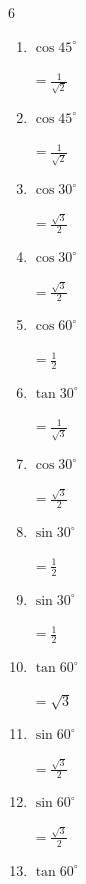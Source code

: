 \begin{multicols}{6}
\begin{enumerate}
        $\displaystyle =\frac{1}{\sqrt{3}}$

  \item $\displaystyle \cos{45^\circ}$

        $\displaystyle =\frac{1}{\sqrt{2}}$

  \item $\displaystyle \cos{45^\circ}$

        $\displaystyle =\frac{1}{\sqrt{2}}$

  \item $\displaystyle \cos{30^\circ}$

        $\displaystyle =\frac{\sqrt{3}}{2}$

\columnbreak %

  \item $\displaystyle \cos{30^\circ}$

        $\displaystyle =\frac{\sqrt{3}}{2}$

  \item $\displaystyle \cos{60^\circ}$

        $\displaystyle =\frac{1}{2}$

  \item $\displaystyle \tan{30^\circ}$

        $\displaystyle =\frac{1}{\sqrt{3}}$

  \item $\displaystyle \cos{30^\circ}$

        $\displaystyle =\frac{\sqrt{3}}{2}$

  \item $\displaystyle \sin{30^\circ}$

        $\displaystyle =\frac{1}{2}$

  \item $\displaystyle \sin{30^\circ}$

        $\displaystyle =\frac{1}{2}$

  \item $\displaystyle \tan{60^\circ}$

        $\displaystyle =\sqrt{3}$

  \item $\displaystyle \sin{60^\circ}$

        $\displaystyle =\frac{\sqrt{3}}{2}$

  \item $\displaystyle \sin{60^\circ}$

        $\displaystyle =\frac{\sqrt{3}}{2}$

  \item $\displaystyle \tan{60^\circ}$


\end{enumerate}
\end{multicols}
